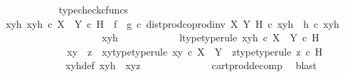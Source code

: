 \begin{isabellebody}
\ \ \ \ \ \ \ \ \ \ \isamarkupfalse%
\ typecheck{\isacharunderscore}{\kern0pt}cfuncs\isanewline
\ \ \ \ \ \ \ \ \isamarkupfalse%
\ {\isachardoublequoteopen}{\isasymAnd}xyh{\isachardot}{\kern0pt}\ xyh\ {\isasymin}\isactrlsub c\ {\isacharparenleft}{\kern0pt}X\ {\isasymCoprod}\ Y{\isacharparenright}{\kern0pt}\ {\isasymtimes}\isactrlsub c\ H\ {\isasymLongrightarrow}\ {\isacharparenleft}{\kern0pt}f\isactrlsup {\isasymflat}\ {\isasymamalg}\ g\isactrlsup {\isasymflat}\ {\isasymcirc}\isactrlsub c\ dist{\isacharunderscore}{\kern0pt}prod{\isacharunderscore}{\kern0pt}coprod{\isacharunderscore}{\kern0pt}inv{}\ X\ Y\ H{\isacharparenright}{\kern0pt}\ {\isasymcirc}\isactrlsub c\ xyh\ {\isacharequal}{\kern0pt}\ h\isactrlsup {\isasymflat}\ {\isasymcirc}\isactrlsub c\ xyh{\isachardoublequoteclose}\isanewline
\ \ \ \ \ \ \ \ \isamarkupfalse%
{\isacharminus}{\kern0pt}\isanewline
\ \ \ \ \ \ \ \ \ \ \isamarkupfalse%
\ xyh\isanewline
\ \ \ \ \ \ \ \ \ \ \isamarkupfalse%
\ l{\isacharunderscore}{\kern0pt}type{\isacharbrackleft}{\kern0pt}type{\isacharunderscore}{\kern0pt}rule{\isacharbrackright}{\kern0pt}{\isacharcolon}{\kern0pt}\ {\isachardoublequoteopen}xyh\ {\isasymin}\isactrlsub c\ {\isacharparenleft}{\kern0pt}X\ {\isasymCoprod}\ Y{\isacharparenright}{\kern0pt}\ {\isasymtimes}\isactrlsub c\ H{\isachardoublequoteclose}\isanewline
\ \ \ \ \ \ \ \ \ \ \isamarkupfalse%
\ \isamarkupfalse%
\ xy\ \ z\ \ xy{\isacharunderscore}{\kern0pt}type{\isacharbrackleft}{\kern0pt}type{\isacharunderscore}{\kern0pt}rule{\isacharbrackright}{\kern0pt}{\isacharcolon}{\kern0pt}\ {\isachardoublequoteopen}xy\ {\isasymin}\isactrlsub c\ X\ {\isasymCoprod}\ Y{\isachardoublequoteclose}\ \ z{\isacharunderscore}{\kern0pt}type{\isacharbrackleft}{\kern0pt}type{\isacharunderscore}{\kern0pt}rule{\isacharbrackright}{\kern0pt}{\isacharcolon}{\kern0pt}\ {\isachardoublequoteopen}z\ {\isasymin}\isactrlsub c\ H{\isachardoublequoteclose}\isanewline
\ \ \ \ \ \ \ \ \ \ \ \ \ xyh{\isacharunderscore}{\kern0pt}def{\isacharcolon}{\kern0pt}\ {\isachardoublequoteopen}xyh\ {\isacharequal}{\kern0pt}\ {\isasymlangle}xy{\isacharcomma}{\kern0pt}z{\isasymrangle}{\isachardoublequoteclose}\isanewline
\ \ \ \ \ \ \ \ \ \ \ \ \isamarkupfalse%
\ cart{\isacharunderscore}{\kern0pt}prod{\isacharunderscore}{\kern0pt}decomp\ \isamarkupfalse%
\ blast\isanewline
\ \ \ \ \ \ \ \ \ \ \isamarkupfalse%

\end{isabellebody}
